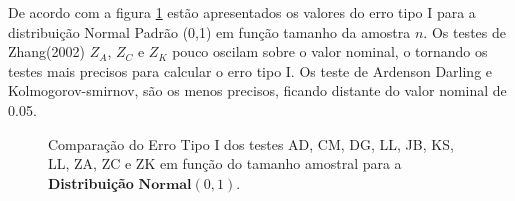 \documentclass[a4paper,11pt]{article} %
\begin{document}
De acordo com a figura \ref{fig:erro_tipo_I_dist_norm} estão apresentados os valores do erro tipo I para a distribuição Normal Padrão (0,1) em função tamanho da amostra $n$. Os testes de Zhang(2002) $Z_{A}$, $Z_{C}$ e $Z_{K}$ pouco oscilam sobre o valor nominal, o tornando os testes mais precisos para calcular o erro tipo I. Os teste de Ardenson Darling e Kolmogorov-smirnov, são os menos precisos, ficando distante do valor nominal de 0.05.







\begin{figure}[H]
    \centering
    \caption{Comparação do Erro Tipo I dos testes AD, CM, DG, LL, JB, KS, LL, ZA, ZC e ZK em função do tamanho amostral para a \textbf{Distribuição} \(\textbf{Normal}(0, 1)\).}
    \label{fig:erro_tipo_I_dist_norm}
    

\end{figure}
\end{document}
